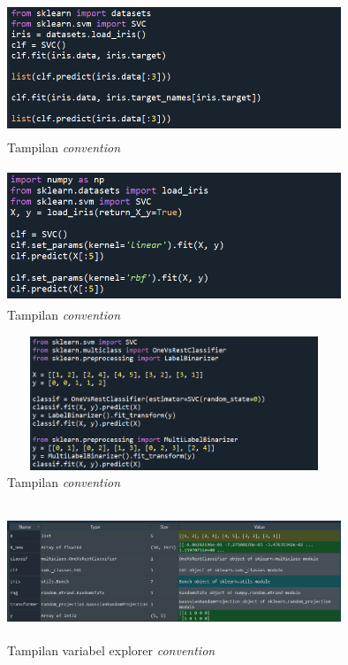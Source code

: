 \documentclass{article}
\begin{document}
    \begin{figure}[!htbp]
            \centering
            \includegraphics[width=10cm,height=4cm]{figures/1184101/chapter1/22.PNG}
            \caption{Tampilan \textit{convention}}
            \label{penanda}
            \end{figure}
            
    \begin{figure}[!htbp]
            \centering
            \includegraphics[width=10cm,height=4cm]{figures/1184101/chapter1/23.PNG}
            \caption{Tampilan \textit{convention}}
            \label{penanda}
            \end{figure}
            
    \begin{figure}[!htbp]
            \centering
            \includegraphics[width=10cm,height=4cm]{figures/1184101/chapter1/24.PNG}
            \caption{Tampilan \textit{convention}}
            \label{penanda}
            \end{figure}

    \begin{figure}[!htbp]
            \centering
            \includegraphics[width=10cm,height=4cm]{figures/1184101/chapter1/25.PNG}
            \caption{Tampilan variabel explorer \textit{convention}}
            \label{penanda}
            \end{figure}
            
\end{document}
